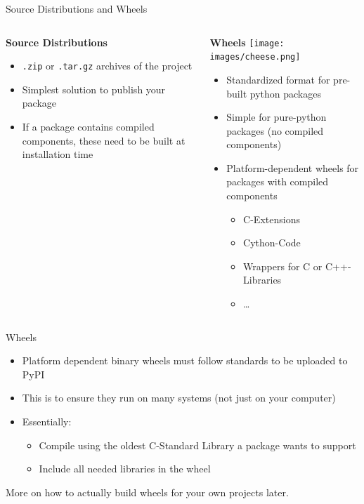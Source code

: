 \begin{frame}[c]{Source Distributions and Wheels}

  \begin{columns}[onlytextwidth, t]%
    \begin{column}{0.495\textwidth}%
      \textbf{\Large Source Distributions}
      \begin{itemize}
        \item \texttt{.zip} or \texttt{.tar.gz} archives of the project
        \item Simplest solution to publish your package
        \item If a package contains compiled components, these need to be built at installation time
      \end{itemize}
    \end{column}%
    \hfill%
    \begin{column}{0.495\textwidth}%
      \textbf{\Large Wheels} \texttt{[image: images/cheese.png]}
      \begin{itemize}
        \item Standardized format for pre-built python packages
        \item Simple for pure-python packages (no compiled components)
        \item Platform-dependent wheels for packages with compiled components
          \begin{itemize}
            \item C-Extensions
            \item Cython-Code
            \item Wrappers for C or C++-Libraries
            \item \dots
          \end{itemize}
      \end{itemize}
    \end{column}%
  \end{columns}%
\end{frame}

\begin{frame}[c]{Wheels}
  \begin{itemize}
    \item Platform dependent binary wheels must follow standards to be uploaded to PyPI
    \item This is to ensure they run on many systems (not just on your computer)
    \item Essentially:
      \begin{itemize}
        \item Compile using the oldest C-Standard Library a package wants to support
        \item Include all needed libraries in the wheel
      \end{itemize}
  \end{itemize}

  \bigskip
  \begin{center}
    \Large More on how to actually build wheels for your own projects later.
  \end{center}
\end{frame}




